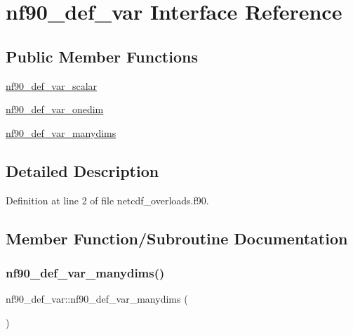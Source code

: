 \hypertarget{interfacenf90__def__var}{}\section{nf90\+\_\+def\+\_\+var Interface Reference}
\label{interfacenf90__def__var}
\subsection*{Public Member Functions}
\begin{DoxyCompactItemize}
\item 
\hyperlink{interfacenf90__def__var_af29045212f1a72967d97e311f3489ad7}{nf90\+\_\+def\+\_\+var\+\_\+scalar}
\item 
\hyperlink{interfacenf90__def__var_a1110d6ddd2f2cd73cd364e4323891b55}{nf90\+\_\+def\+\_\+var\+\_\+onedim}
\item 
\hyperlink{interfacenf90__def__var_aa075878f69f036d30cf8d604a365b08b}{nf90\+\_\+def\+\_\+var\+\_\+manydims}
\end{DoxyCompactItemize}


\subsection{Detailed Description}


Definition at line 2 of file netcdf\+\_\+overloads.\+f90.



\subsection{Member Function/\+Subroutine Documentation}
\mbox{\label{interfacenf90__def__var_aa075878f69f036d30cf8d604a365b08b}} 
\subsubsection{\texorpdfstring{nf90\+\_\+def\+\_\+var\+\_\+manydims()}{nf90\_def\_var\_manydims()}}
{\footnotesize\ttfamily nf90\+\_\+def\+\_\+var\+::nf90\+\_\+def\+\_\+var\+\_\+manydims (\begin{DoxyParamCaption}{ }\end{DoxyParamCaption})}

